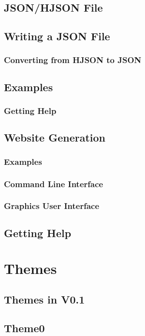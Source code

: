 \documentclass[12pt]{article}
\begin{document}
    \subsection{JSON/HJSON File}
    \subsection{Writing a JSON File}
    \subsubsection{Converting from HJSON to JSON}
    \subsection{Examples}
    \subsubsection{Getting Help}
    \subsection{Website Generation}
    \subsubsection{Examples}
    \subsubsection{Command Line Interface}
    \subsubsection{Graphics User Interface}
    \subsection{Getting Help}
    \section{Themes}
    \subsection{Themes in V0.1}
    \subsection{Theme0}
\end{document}
